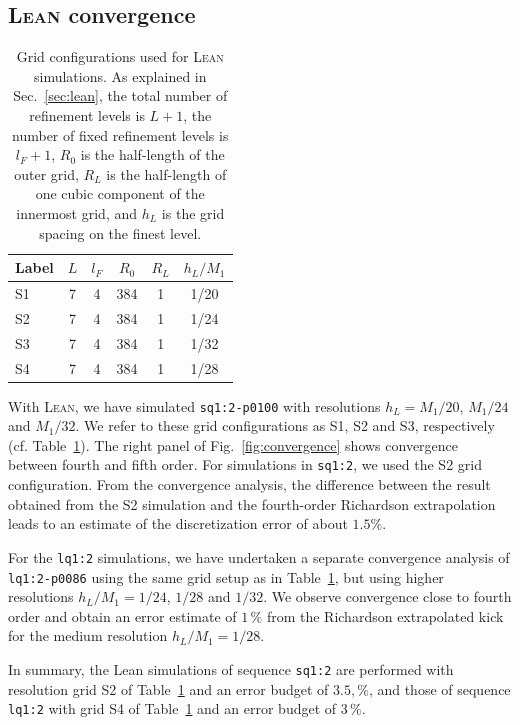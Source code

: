 \documentclass[floats,floatfix,showpacs,amssymb,prd,twocolumn,superscriptaddress,nofootinbib,nolongbibliography,reprint]{revtex4-2}
\begin{document}
\subsection{\textsc{Lean} convergence}
\begin{table}[t]
    {
    \centering
    \begin{ruledtabular}
    \begin{tabular}{l|ccccc}
        Label & $L$ & $l_F$ & $R_0$ & $R_L$ & $h_L/M_1$\\
        \hline
        S1 & 7 & 4 & 384 & 1 & 1/20\\
        S2 & 7 & 4 & 384 & 1 & 1/24\\
        S3 & 7 & 4 & 384 & 1 & 1/32\\
        S4 & 7 & 4 & 384 & 1 & 1/28\\
    \end{tabular}
    \end{ruledtabular}
    }
    \caption{Grid configurations used for \textsc{Lean} simulations. As 
    explained in Sec.~\ref{sec:lean}, the total number of refinement 
    levels is $L+1$, the number of fixed refinement levels is $l_F+1$, 
    $R_0$ is the half-length of the outer grid, $R_L$ is the half-length 
    of one cubic component of the innermost grid, and $h_L$ is the grid 
    spacing on the finest level.}
    \label{tab:lean-grids}
\end{table}

With \textsc{Lean}, we have simulated \texttt{sq1:2-p0100} with
resolutions $h_L = M_1/20$, $M_1/24$ and $M_1/32$. We refer to these
grid configurations as S1, S2 and S3, respectively
(cf. Table~\ref{tab:lean-grids}). The right panel of Fig.~\ref{fig:convergence}
shows convergence between fourth and fifth order. For simulations in
\texttt{sq1:2}, we used the S2 grid configuration. From the
convergence analysis, the difference between the result obtained from
the S2 simulation and the fourth-order Richardson extrapolation leads
to an estimate of the discretization error of about $1.5\%$.

For the \texttt{lq1:2} simulations, we have undertaken a separate
convergence analysis of \texttt{lq1:2-p0086} using the same grid
setup as in
Table~\ref{tab:lean-grids}, but using higher resolutions
$h_L/M_1=1/24$, $1/28$ and $1/32$. We observe convergence close to
fourth order and obtain an error estimate of $1\,\%$ from
the Richardson extrapolated kick for the medium resolution
$h_L/M_1=1/28$.

In summary, the {\sc Lean} simulations of sequence \texttt{sq1:2} are
performed with resolution grid S2 of Table~\ref{tab:lean-grids} and an
error budget of $3.5,\%$, and those of sequence \texttt{lq1:2} with
grid S4 of Table~\ref{tab:lean-grids} and an error budget of $3\,\%$.
\end{document}
